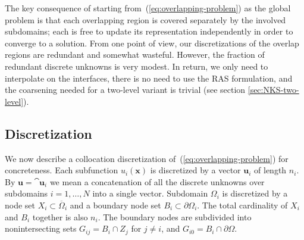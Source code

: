 The key consequence of starting from~(\ref{eq:overlapping-problem}) as the global problem is that each overlapping region is covered separately by the involved subdomains; each is free to update its representation independently in order to converge to a solution. From one point of view, our discretizations of the overlap regions are redundant and somewhat wasteful. However, the fraction of redundant discrete unknowns is very modest. In return, we only need to interpolate on the interfaces, there is no need to use the RAS formulation, and the coarsening needed for a two-level variant is trivial (see section \ref{sec:NKS-two-level}).

\subsection{Discretization}

\label{sec:discretization}

We now describe a collocation discretization of~(\ref{eq:overlapping-problem}) for concreteness. Each subfunction $u_i(\bm{x})$ is discretized by a vector $\bm{u}_i$ of length $n_i$. By $\bm{u}=\cat{\bm{u}_i}$ we mean a concatenation of all the discrete unknowns over subdomains $i=1,\ldots,N$ into a single vector. Subdomain $\Omega_i$ is discretized by a node set $X_i\subset \overline{\Omega}_i$ and a boundary node set $B_i \subset \partial\Omega_i$. The total cardinality of $X_i$ and $B_i$ together is also $n_i$. The boundary nodes are subdivided into nonintersecting sets $G_{ij}=B_i\cap Z_j$ for $j\neq i$, and $G_{i0}= B_i \cap \partial\Omega$.

